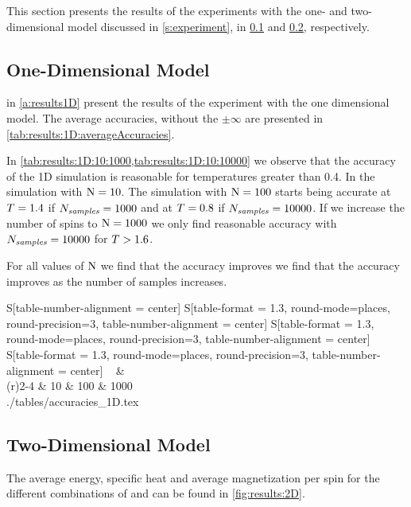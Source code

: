 This section presents the results of the experiments with the one- and two- dimensional model discussed in \cref{s:experiment}, in \cref{ss:results:1D} and \cref{ss:results:2D}, respectively.

\subsection{One-Dimensional Model}
\label{ss:results:1D}
	 in \cref{a:results1D} present the results of the experiment with the one dimensional model. The average accuracies, without the $\pm \infty$ are presented in \cref{tab:results:1D:averageAccuracies}.

	In \cref{tab:results:1D:10:1000,tab:results:1D:10:10000} we observe that the accuracy of the 1D simulation is reasonable for temperatures greater than 0.4. In the simulation with $\mathrm{N} = 10$. 
	The simulation with $\mathrm{N} = 100$ starts being accurate at $T = 1.4$ if $N_\textit{samples} = 1000$ and at $T = 0.8$ if $N_\textit{samples} = 10000$. 
	If we increase the number of spins to $\mathrm{N} = 1000$ we only find reasonable accuracy with $N_\textit{samples} = 10000$ for $T > 1.6$.

	For all values of $\mathrm{N}$ we find that the accuracy improves we find that the accuracy improves as the number of samples increases. 

	\begin{table}
		\makeatletter	
		\centering
		\caption{Average accuracies of the one-dimensional simulation.}
		\begin{tabular}{
			S[table-number-alignment = center]
			S[table-format = 1.3, round-mode=places, round-precision=3, table-number-alignment = center]
			S[table-format = 1.3, round-mode=places, round-precision=3, table-number-alignment = center]
			S[table-format = 1.3, round-mode=places, round-precision=3, table-number-alignment = center]}
			\toprule
			~ & \\ 
			\cmidrule(r){2-4}
			\numberOfSamples & 10 & 100 & 1000 \\
			 \midrule 
			 \@@input./tables/accuracies_1D.tex
			\bottomrule
		\end{tabular}
		\label{tab:results:1D:averageAccuracies}			
		\makeatother
	\end{table}

\subsection{Two-Dimensional Model}
\label{ss:results:2D}
	The average energy, specific heat and average magnetization per spin for the different combinations of \numberOfSpins and \numberOfSamples can be found in \cref{fig:results:2D}. 

